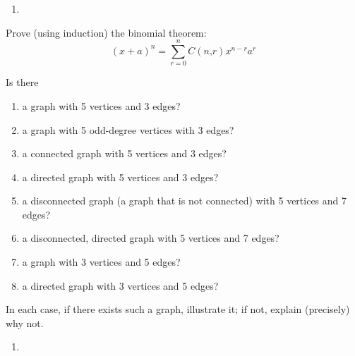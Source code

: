 \documentclass[12pt]{article}
\newenvironment{solution}[2][Solution]{ \begin{trivlist}
\item[\hskip \labelsep {\bfseries #1}]}{\end{trivlist}}
\newenvironment{problem}[2][Problem]{\begin{trivlist}
\item[\hskip \labelsep {\bfseries #1}\hskip \labelsep {\bfseries #2.}]}{\end{trivlist}}
\begin{document}
\begin{solution}{1}
\item[]
\begin{enumerate}
    \parskip=0in
    \parsep=0in
    \itemsep=0.1in
\item
\end{enumerate}
\end{solution}



\vskip 0.5in
\newpage
\begin{problem}{2}
Prove (using induction) the binomial theorem:
\[
(x+a)^n = \sum_{r=0}^n C(n‚ r)x^{n-r}a^r
\]
\end{problem}
\begin{solution}{2}
\item[]
\end{solution}


\pagebreak
\pagebreak
\newpage
\clearpage
\begin{problem}{3}
Is there
\begin{enumerate}
    \parskip=0in
    \parsep=0in
    \itemsep=0.1in
    \item a graph with 5 vertices and 3 edges?

    \item a graph with 5 odd-degree vertices with 3 edges?

    \item a connected graph with 5 vertices and 3 edges?

    \item a directed graph with 5 vertices and 3 edges?

    \item a disconnected graph (a graph that is not connected) with 5
vertices and 7 edges?

    \item a disconnected, directed graph with 5 vertices and 7 edges?

    \item a graph with 3 vertices and 5 edges?

    \item a directed graph with 3 vertices and 5 edges?
\end{enumerate}

In each case, if there exists such a graph, illustrate it; if not, explain (precisely) why not.
\end{problem}
\begin{solution}{3}
\item[]
\begin{enumerate}
\item
\end{enumerate}
\end{solution}
\end{document}

